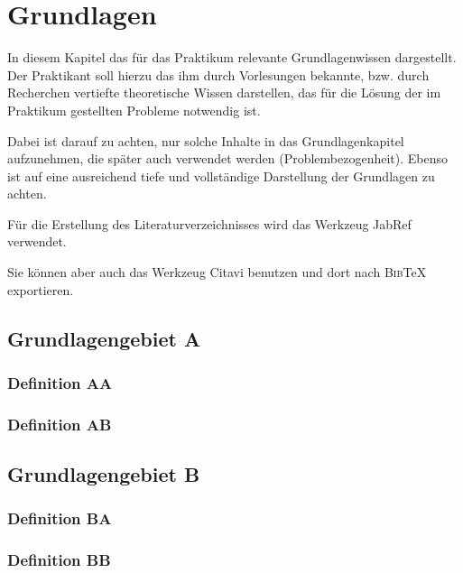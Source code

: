 \documentclass[oneside]{ausarbeitung}
\begin{document}
\chapter{Grundlagen}
\label{cha:grundlagen}

In diesem Kapitel das für das Praktikum relevante Grundlagenwissen 
dargestellt. Der Praktikant soll hierzu das ihm durch Vorlesungen 
bekannte, bzw. durch Recherchen vertiefte theoretische Wissen 
darstellen, das für die Lösung der im Praktikum gestellten Probleme 
notwendig ist.

Dabei ist darauf zu achten, nur solche Inhalte in das Grundlagenkapitel 
aufzunehmen, die später auch verwendet werden (Problembezogenheit). 
Ebenso ist auf eine ausreichend tiefe und vollständige Darstellung der 
Grundlagen zu achten.

Für die Erstellung des Literaturverzeichnisses 
wird das Werkzeug JabRef\autocite{JabRef:JabRef} verwendet. 

Sie können aber auch das Werkzeug Citavi\autocite{SAS:Citavi} benutzen
und dort nach \textsc{Bib}\TeX{} exportieren.

\section{Grundlagengebiet A}
\label{sec:grundlagengebieta}

\subsection{Definition AA}
\label{sub:definitionaa}

\subsection{Definition AB}
\label{sub:definitionab}

\section{Grundlagengebiet B}
\label{sec:grundlagengebietb}

\subsection{Definition BA}
\label{sub:definitionBa}

\subsection{Definition BB}
\label{sub:definitionbb}
\end{document}

